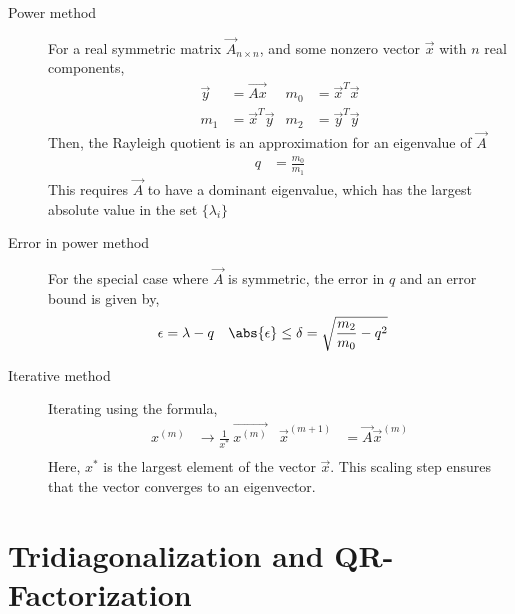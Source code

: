 \begin{description}
    \item[Power method] For a real symmetric matrix $ \vec{A}_{n\times n} $, and some
        nonzero vector $ \vec{x} $ with $ n $ real components,
        \begin{align}
            \vec{y} & = \vec{Ax}         & m_0 & = \vec{x}^T \vec{x} \\
            m_1     & = \vec{x}^T\vec{y} & m_2 & = \vec{y}^T \vec{y}
        \end{align}
        Then, the Rayleigh quotient is an approximation for an eigenvalue of $ \vec{A} $
        \begin{align}
            q & = \frac{m_0}{m_1}
        \end{align}
        This requires $ \vec{A} $ to have a dominant eigenvalue, which has the largest
        absolute value in the set $ \{\lambda_i\} $

    \item[Error in power method] For the special case where $ \vec{A} $ is symmetric,
        the error in $ q $ and an error bound is given by,
        \begin{align}
            \epsilon       & = \lambda - q                              &
            \abs{\epsilon} & \leq \delta = \sqrt{\frac{m_2}{m_0} - q^2}
        \end{align}

    \item[Iterative method] Iterating using the formula,
        \begin{align}
            x^{(m)}         & \to \frac{1}{x^*}\ \vec{x^{(m)}} &
            \vec{x}^{(m+1)} & = \vec{A} \vec{x}^{(m)}            \\
        \end{align}
        Here, $ x^* $ is the largest element of the vector $ \vec{x} $. This scaling
        step ensures that the vector converges to an eigenvector.
\end{description}

\section{Tridiagonalization and QR-Factorization}

